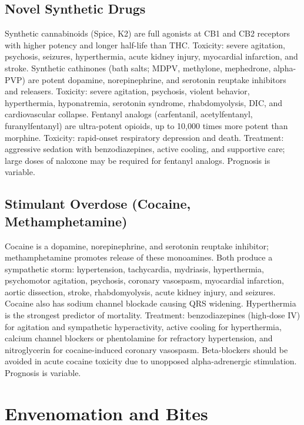 \subsection{Novel Synthetic Drugs}
\label{sec:Novel Synthetic Drugs}
Synthetic cannabinoids (Spice, K2) are full agonists at CB1 and CB2 receptors with higher potency and longer half-life than THC. Toxicity: severe agitation, psychosis, seizures, hyperthermia, acute kidney injury, myocardial infarction, and stroke. Synthetic cathinones (bath salts; MDPV, methylone, mephedrone, alpha-PVP) are potent dopamine, norepinephrine, and serotonin reuptake inhibitors and releasers. Toxicity: severe agitation, psychosis, violent behavior, hyperthermia, hyponatremia, serotonin syndrome, rhabdomyolysis, DIC, and cardiovascular collapse. Fentanyl analogs (carfentanil, acetylfentanyl, furanylfentanyl) are ultra-potent opioids, up to 10,000 times more potent than morphine. Toxicity: rapid-onset respiratory depression and death. Treatment: aggressive sedation with benzodiazepines, active cooling, and supportive care; large doses of naloxone may be required for fentanyl analogs. Prognosis is variable.

\subsection{Stimulant Overdose (Cocaine, Methamphetamine)}
\label{sec:Stimulant Overdose}
Cocaine is a dopamine, norepinephrine, and serotonin reuptake inhibitor; methamphetamine promotes release of these monoamines. Both produce a sympathetic storm: hypertension, tachycardia, mydriasis, hyperthermia, psychomotor agitation, psychosis, coronary vasospasm, myocardial infarction, aortic dissection, stroke, rhabdomyolysis, acute kidney injury, and seizures. Cocaine also has sodium channel blockade causing QRS widening. Hyperthermia is the strongest predictor of mortality. Treatment: benzodiazepines (high-dose IV) for agitation and sympathetic hyperactivity, active cooling for hyperthermia, calcium channel blockers or phentolamine for refractory hypertension, and nitroglycerin for cocaine-induced coronary vasospasm. Beta-blockers should be avoided in acute cocaine toxicity due to unopposed alpha-adrenergic stimulation. Prognosis is variable.

\section{Envenomation and Bites}

